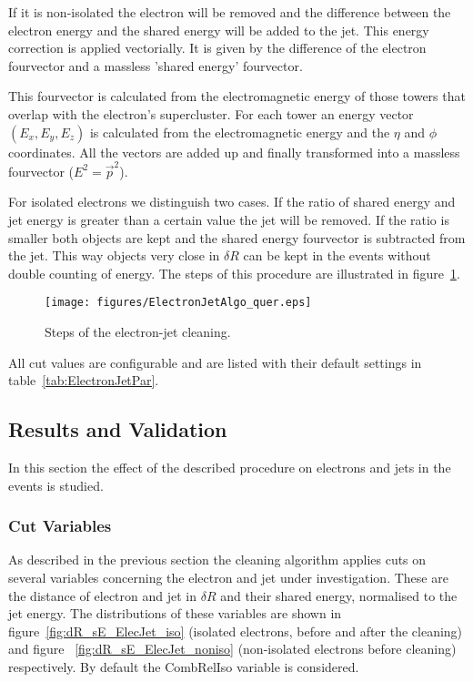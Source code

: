 \documentclass{cmspaper}
\begin{document}
If it is non-isolated the electron will be removed and the difference between
the electron energy and the shared energy will be added to the jet. This energy
correction is applied vectorially. It is given by the difference of the electron
fourvector and a massless 'shared energy' fourvector.

This fourvector is calculated from the electromagnetic energy of those towers
that overlap with the electron's supercluster. For each
tower an energy vector $(E_x, E_y, E_z)$ is calculated from the electromagnetic
energy and the $\eta$ and $\phi$ coordinates. All the vectors are added
up and finally transformed into a massless fourvector ($E^2=\vec{p}^2$).

For isolated electrons we distinguish two cases. If the ratio of shared energy
and jet energy is greater than a certain value the jet will be removed. If the
ratio is smaller both objects are kept and the shared energy fourvector is subtracted from
the jet. This way objects very close in $\delta R$ can be kept in the events
without double counting of energy.
The steps of this procedure are illustrated in figure~\ref{fig:EJCleaning}.

\begin{figure}[hbtp]
  \begin{center}
    \texttt{[image: figures/ElectronJetAlgo\_quer.eps]}
    \caption{Steps of the electron-jet cleaning.}
    \label{fig:EJCleaning}
  \end{center}
\end{figure}

All cut values are configurable and are listed with their default settings in
table~\ref{tab:ElectronJetPar}.

\subsection{Results and Validation}
In this section the effect of the described procedure on electrons and jets in
the events is studied. 

\subsubsection{Cut Variables}
As described in the previous section the cleaning algorithm applies cuts on
several variables concerning the electron and jet under investigation. These are
the distance of electron and jet in $\delta R$ and their shared energy,
normalised to the jet energy. The distributions of these variables are shown
in figure~\ref{fig:dR_sE_ElecJet_iso} (isolated electrons, before and after the
cleaning) and figure ~\ref{fig:dR_sE_ElecJet_noniso} (non-isolated electrons
before cleaning) respectively. By default the CombRelIso variable is considered.
\end{document}
